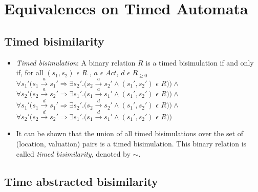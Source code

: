 \documentclass{article}
\begin{document}
  \section{Equivalences on Timed Automata}

  \subsection{Timed bisimilarity}
  
  \begin{itemize}
  \item \emph{Timed bisimulation}: A binary relation $R$ is a timed
    bisimulation if and only if, for all $(s_1, s_2)$ $\epsilon$ $R$ , $a$ $\epsilon$ $Act $, $d$ $\epsilon$ $R_{\ge 0}$\\
    $\forall s_1' (s_1 \xrightarrow{a} s_1' \Rightarrow \exists s_2'
    . (s_2 \xrightarrow{a} s_2' \wedge (s_1', s_2')$ $\epsilon$ $R ) )
    \wedge $ \\
    $\forall s_2' (s_2 \xrightarrow{a} s_2' \Rightarrow \exists s_1'
    . (s_1 \xrightarrow{a} s_1' \wedge (s_1', s_2')$ $\epsilon$ $R ) ) \wedge $ \\
    $\forall s_1' (s_1 \xrightarrow{d} s_1' \Rightarrow \exists s_2'
    . (s_2 \xrightarrow{d} s_2' \wedge (s_1', s_2')$ $\epsilon$ $R ) )
    \wedge $ \\
    $\forall s_2' (s_2 \xrightarrow{d} s_2' \Rightarrow \exists s_1'
    . (s_1 \xrightarrow{d} s_1' \wedge (s_1', s_2')$ $\epsilon$ $R ) ) $ \\
    
  \item It can be shown that the union of all timed bisimulations
    over the set of (location, valuation) pairs is a timed bisimulation. This binary
    relation is called \textit{timed bisimilarity}, denoted by $\sim$.
  \end{itemize}
  
  \subsection{Time abstracted bisimilarity}
  
\end{document}
